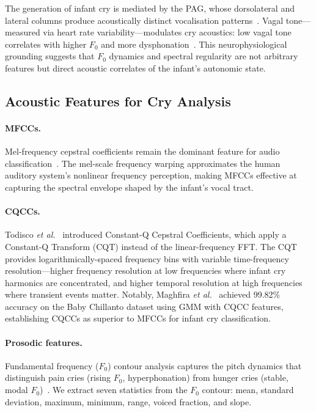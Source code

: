 \documentclass[11pt,a4paper]{article}
\begin{document}
The generation of infant cry is mediated by the PAG, whose dorsolateral
and lateral columns produce acoustically distinct vocalisation
patterns~\cite{newman2007cry}. Vagal tone---measured via heart rate
variability---modulates cry acoustics: low vagal tone correlates with
higher $F_0$ and more dysphonation~\cite{porges2011polyvagal}. This
neurophysiological grounding suggests that $F_0$ dynamics and spectral
regularity are not arbitrary features but direct acoustic correlates of
the infant's autonomic state.

\subsection{Acoustic Features for Cry Analysis}

\paragraph{MFCCs.}
Mel-frequency cepstral coefficients remain the dominant feature for
audio classification~\cite{davis1980mfcc}. The mel-scale frequency
warping approximates the human auditory system's nonlinear frequency
perception, making MFCCs effective at capturing the spectral envelope
shaped by the infant's vocal tract.

\paragraph{CQCCs.}
Todisco \textit{et al.}~\cite{todisco2017cqcc} introduced Constant-Q
Cepstral Coefficients, which apply a Constant-Q Transform (CQT) instead
of the linear-frequency FFT. The CQT provides logarithmically-spaced
frequency bins with variable time-frequency resolution---higher
frequency resolution at low frequencies where infant cry harmonics are
concentrated, and higher temporal resolution at high frequencies where
transient events matter. Notably, Maghfira \textit{et al.}~\cite{maghfira2020gmm} achieved 99.82\% accuracy
on the Baby Chillanto dataset using GMM with CQCC features, establishing
CQCCs as superior to MFCCs for infant cry classification.

\paragraph{Prosodic features.}
Fundamental frequency ($F_0$) contour analysis captures the pitch
dynamics that distinguish pain cries (rising $F_0$, hyperphonation) from
hunger cries (stable, modal $F_0$)~\cite{lester1978acoustic}. We
extract seven statistics from the $F_0$ contour: mean, standard
deviation, maximum, minimum, range, voiced fraction, and slope.
\end{document}
